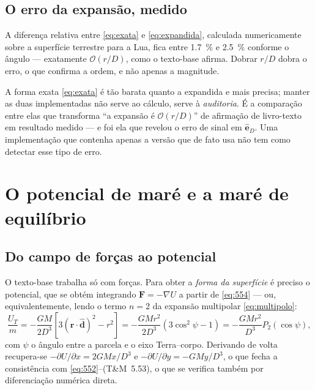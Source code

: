 \documentclass[11pt,a4paper,oneside]{report}
\theoremstyle{definition}
\theoremstyle{plain}
\theoremstyle{remark}
\newcommand{\vect}[1]{\bm{#1}}
\newcommand{\uvec}[1]{\hat{\bm{#1}}}
\newcommand{\ordem}[1]{\mathcal{O}\!\left(#1\right)}
\begin{document}
\section{O erro da expansão, medido}

A diferença relativa entre \eqref{eq:exata} e \eqref{eq:expandida}, calculada
numericamente sobre a superfície terrestre para a Lua, fica entre
\SI{1.7}{\percent} e \SI{2.5}{\percent} conforme o ângulo — exatamente
$\ordem{r/D}$, como o texto-base afirma. Dobrar $r/D$ dobra o erro, o que
confirma a ordem, e não apenas a magnitude.

\begin{caixa}
A forma exata \eqref{eq:exata} é tão barata quanto a expandida e mais precisa;
manter as duas implementadas não serve ao cálculo, serve à \emph{auditoria}. É a comparação
entre elas que transforma ``a expansão é $\ordem{r/D}$'' de afirmação de
livro-texto em resultado medido — e foi ela que revelou o erro de sinal em
$\uvec{e}_D$. Uma implementação que contenha apenas a versão que de fato usa não tem
como detectar esse tipo de erro.
\end{caixa}

\chapter{O potencial de maré e a maré de equilíbrio}
\label{cap:potencial}

\section{Do campo de forças ao potencial}

O texto-base trabalha só com forças. Para obter a \emph{forma da superfície} é
preciso o potencial, que se obtém integrando $\vect{F}=-\nabla U$ a partir de
\eqref{eq:554} — ou, equivalentemente, lendo o termo $n=2$ da expansão
multipolar \eqref{eq:multipolo}:
\begin{equation}
\boxed{\;
\frac{U_T}{m}=-\frac{GM}{2D^{3}}\left[3(\vect{r}\cdot\uvec{d})^{2}-r^{2}\right]
=-\frac{GMr^{2}}{2D^{3}}\left(3\cos^{2}\psi-1\right)
=-\frac{GMr^{2}}{D^{3}}P_2(\cos\psi),\;}
\label{eq:potencial}
\end{equation}
com $\psi$ o ângulo entre a parcela e o eixo Terra--corpo. Derivando de volta
recupera-se $-\partial U/\partial x=2GMx/D^{3}$ e
$-\partial U/\partial y=-GMy/D^{3}$, o que fecha a consistência com
\eqref{eq:552}--(T\&M~5.53), o que se verifica também por diferenciação
numérica direta.
\end{document}
